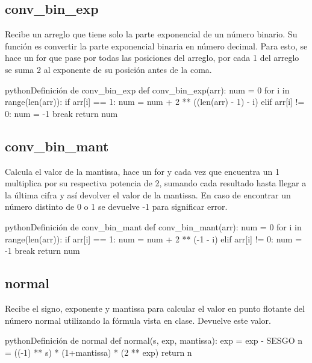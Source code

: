 	\subsection{conv\_bin\_exp}
		Recibe un arreglo que tiene solo la parte exponencial de un número binario. Su función es convertir la parte exponencial binaria en número decimal. Para esto, se hace un for que pase por todas las posiciones del arreglo, por cada 1 del arreglo se suma 2 al exponente de su posición antes de la coma.
		
		\begin{sourcecode}[\label{codigo-python-2}]{python}{Definición de conv\_bin\_exp}	
def conv_bin_exp(arr):
    num = 0
    for i in range(len(arr)):
        if arr[i] == 1:
            num = num + 2 ** ((len(arr) - 1) - i)
        elif arr[i] != 0:
            num = -1
            break
    return num\end{sourcecode}

	\subsection{conv\_bin\_mant}
		Calcula el valor de la mantissa, hace un for y cada vez que encuentra un 1 multiplica por su respectiva potencia de 2, sumando cada resultado hasta llegar a la última cifra y así devolver el valor de la mantissa. En caso de encontrar un número distinto de 0 o 1 se devuelve -1 para significar error.
		
				\begin{sourcecode}[\label{codigo-python-3}]{python}{Definición de conv\_bin\_mant}	
def conv_bin_mant(arr):
    num = 0
    for i in range(len(arr)):
        if arr[i] == 1:
            num = num + 2 ** (-1 - i)
        elif arr[i] != 0:
            num = -1
            break
    return num\end{sourcecode}

	\subsection{normal}
		Recibe el signo, exponente y mantissa para calcular el valor en punto flotante del número normal utilizando la fórmula vista en clase. Devuelve este valor.

\begin{sourcecode}[\label{codigo-python-4}]{python}{Definición de normal}	
def normal(s, exp, mantissa):
    exp = exp - SESGO
    n = ((-1) ** s) * (1+mantissa) * (2 ** exp)
    return n\end{sourcecode}

